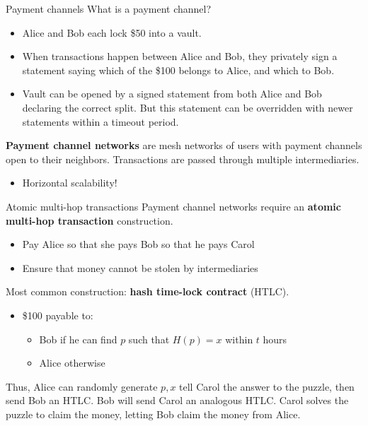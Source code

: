 \documentclass[aspectratio=169]{beamer}
\begin{document}
\begin{frame}{Payment channels}
    What is a payment channel?
    \begin{itemize}
        \item Alice and Bob each lock \$50 into a vault.
        \item When transactions happen between Alice and Bob, they privately sign a statement saying which of the \$100 belongs to Alice, and which to Bob.
        \item Vault can be opened by a signed statement from both Alice and Bob declaring the correct split. But this statement can be overridden with newer statements within a timeout period.
    \end{itemize}

    \textbf{Payment channel networks} are mesh networks of users with payment channels open to their neighbors. Transactions are passed through multiple intermediaries.
    \begin{itemize}
        \item Horizontal scalability!
    \end{itemize}
\end{frame}

\begin{frame}{Atomic multi-hop transactions}
    Payment channel networks require an \textbf{atomic multi-hop transaction} construction.
    \begin{itemize}
        \item Pay Alice so that she pays Bob so that he pays Carol
        \item Ensure that money cannot be stolen by intermediaries
    \end{itemize}

    Most common construction: \textbf{hash time-lock contract} (HTLC).
    \begin{itemize}
        \item \$100 payable to:
              \begin{itemize}
                  \item Bob if he can find $p$ such that $H(p) = x$ within $t$ hours
                  \item Alice otherwise
              \end{itemize}
    \end{itemize}

    Thus, Alice can randomly generate $p,x$ tell Carol the answer to the puzzle, then send Bob an HTLC. Bob will send Carol an analogous HTLC. Carol solves the puzzle to claim the money, letting Bob claim the money from Alice.
\end{frame}
\end{document}
